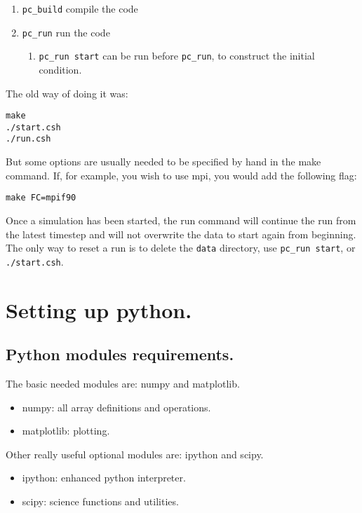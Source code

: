 \documentclass[a4paper,12pt]{article}
\begin{document}
\begin{enumerate}
  \item \verb|pc_build| compile the code
  \item \verb|pc_run| run the code
    \begin{enumerate}
      \item \verb|pc_run start| can be run before \verb|pc_run|, to construct
        the initial condition.
    \end{enumerate}
\end{enumerate}

The old way of doing it was:
\begin{verbatim}
make
./start.csh
./run.csh
\end{verbatim}
But some options are usually needed to be specified by hand in the make command. If, for example, you wish to use mpi, you would add the following flag:
\begin{verbatim}
make FC=mpif90
\end{verbatim}

Once a simulation has been started, the run command will continue the run from the latest timestep and will not overwrite the data to start again from beginning. The only way to reset a run is to delete the \verb|data| directory, use \verb|pc_run start|, or \verb|./start.csh|. %
    
\section{Setting up python.}
\subsection{Python modules requirements.}
The basic needed modules are: numpy and matplotlib.
\begin{itemize}
 \item numpy: all array definitions and operations.
  \item matplotlib: plotting.
\end{itemize}

Other really useful optional modules are: ipython and scipy.

\begin{itemize}
 \item ipython: enhanced python interpreter.
  \item scipy: science functions and utilities.
\end{itemize}
\end{document}
